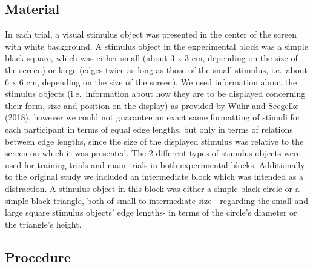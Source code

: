 \documentclass[
  english,
  man,floatsintext]{apa6}
\begin{document}
\hypertarget{material}{%
\subsection{Material}\label{material}}

In each trial, a visual stimulus object was presented in the center of the screen with white background. A stimulus object in the experimental block was a simple black square, which was either small (about 3 x 3 cm, depending on the size of the screen) or large (edges twice as long as those of the small stimulus, i.e.~about 6 x 6 cm, depending on the size of the screen). We used information about the stimulus objects (i.e.~information about how they are to be displayed concerning their form, size and position on the display) as provided by Wühr and Seegelke (2018), however we could not guarantee an exact same formatting of stimuli for each participant in terms of equal edge lengths, but only in terms of relations between edge lengths, since the size of the displayed stimulus was relative to the screen on which it was presented. The 2 different types of stimulus objects were used for training trials and main trials in both experimental blocks. Additionally to the original study we included an intermediate block which was intended as a distraction. A stimulus object in this block was either a simple black circle or a simple black triangle, both of small to intermediate size - regarding the small and large square stimulus objects' edge lengths- in terms of the circle's diameter or the triangle's height.
~

\hypertarget{procedure}{%
\subsection{Procedure}\label{procedure}}
\end{document}
